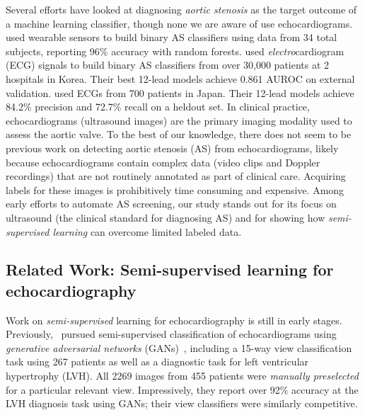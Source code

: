 Several efforts have looked at diagnosing \emph{aortic stenosis} as the target outcome of a machine learning classifier, though none we are aware of use echocardiograms. %
\citet{yangClassificationAorticStenosis2020} used wearable sensors to build binary AS classifiers using data from 34 total subjects, reporting 96\% accuracy with random forests.
\citet{kwonDeepLearningBased2020} used \emph{electro}cardiogram (ECG) signals to build binary AS classifiers from over 30,000 patients at 2 hospitals in Korea.
Their best 12-lead models achieve 0.861 AUROC on external validation.
\citet{hataClassificationAorticStenosis2020} used ECGs from 700 patients in Japan.
Their 12-lead models achieve 84.2\% precision and 72.7\% recall on a heldout set.
In clinical practice, echocardiograms (ultrasound images) are the primary imaging modality used to assess the aortic valve.
To the best of our knowledge, there does not seem to be previous work on detecting aortic stenosis (AS) from echocardiograms, likely because echocardiograms contain complex data (video clips and Doppler recordings) that are not routinely annotated as part of clinical care. Acquiring labels for these images is prohibitively time consuming and expensive.
Among early efforts to automate AS screening, our study stands out for its focus on ultrasound (the clinical standard for diagnosing AS) and for showing how \emph{semi-supervised learning} can overcome limited labeled data.

\subsection{Related Work: Semi-supervised learning for echocardiography}

Work on \emph{semi-supervised} learning for echocardiography is still in early stages.
Previously,~\citet{madaniDeepEchocardiographyDataefficient2018} pursued semi-supervised classification of echocardiograms using \emph{generative adversarial networks} (GANs)~\citep{goodfellowGenerativeAdversarialNets2014}, including a 15-way view classification task using 267 patients as well as a diagnostic task for left ventricular hypertrophy (LVH).
All 2269 images from 455 patients were \emph{manually preselected} for a particular relevant view.
Impressively, they report over 92\% accuracy at the LVH diagnosis task using GANs; their view classifiers were similarly competitive.

